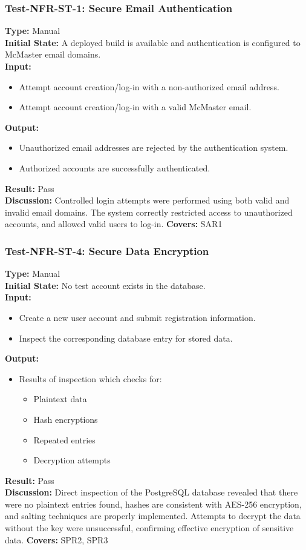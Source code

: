 \documentclass[12pt, titlepage]{article}
\begin{document}
\subsubsection{Test-NFR-ST-1: Secure Email Authentication}
\textbf{Type:} Manual \\
\textbf{Initial State:} A deployed build is available and authentication is configured to McMaster email domains. \\
\textbf{Input:}
\begin{itemize}
    \item Attempt account creation/log-in with a non-authorized email address.
    \item Attempt account creation/log-in with a valid McMaster email.
\end{itemize}
\textbf{Output:}
\begin{itemize}
    \item Unauthorized email addresses are rejected by the authentication system.
    \item Authorized accounts are successfully authenticated.
\end{itemize}
\textbf{Result:} Pass \\
\textbf{Discussion:} Controlled login attempts were performed using both valid and invalid email domains. The system correctly restricted access to unauthorized accounts, and allowed valid users to log-in.
\textbf{Covers:} SAR1 \\

\subsubsection{Test-NFR-ST-4: Secure Data Encryption}
\textbf{Type:} Manual \\
\textbf{Initial State:} No test account exists in the database. \\
\textbf{Input:}
\begin{itemize}
    \item Create a new user account and submit registration information.
    \item Inspect the corresponding database entry for stored data.
\end{itemize}
\textbf{Output:}
\begin{itemize}
    \item Results of inspection which checks for:
    \begin{itemize}
        \item Plaintext data
        \item Hash encryptions
        \item Repeated entries
        \item Decryption attempts
    \end{itemize}
\end{itemize}
\textbf{Result:} Pass \\
\textbf{Discussion:} Direct inspection of the PostgreSQL database revealed that there were no plaintext entries found, hashes are consistent with AES-256 encryption, and salting techniques are properly implemented. Attempts to decrypt the data without the key were unsuccessful, confirming effective encryption of sensitive data.
\textbf{Covers:} SPR2, SPR3 \\
\end{document}
